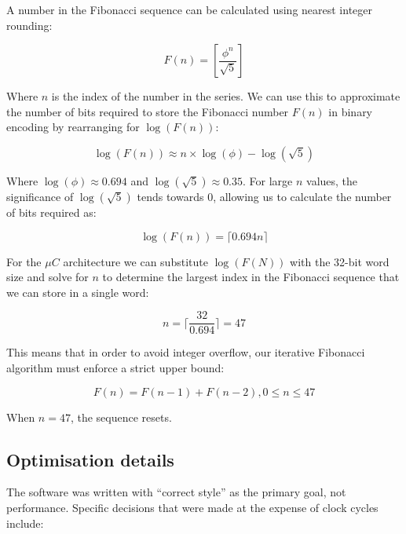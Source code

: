 \documentclass[12pt,a4paper]{article}
\begin{document}
A number in the Fibonacci sequence can be calculated using nearest
integer rounding:

$$F(n) = \left[\frac{\phi^n}{\sqrt{5}}\right] $$

Where $n$ is the index of the number in the series. We can use this to
approximate the number of bits required to store the Fibonacci number
$F(n)$ in binary encoding by rearranging for $\log(F(n))$:

$$\log(F(n)) \approx n \times \log(\phi) - \log(\sqrt{5})$$

Where $\log(\phi) \approx 0.694$ and $\log(\sqrt{5}) \approx
0.35$. For large $n$ values, the significance of $\log(\sqrt{5})$
tends towards $0$, allowing us to calculate the number of bits
required as:

$$\log(F(n)) = \lceil 0.694n \rceil$$

For the $\mu C$ architecture we can substitute $\log(F(N))$ with the
32-bit word size and solve for $n$ to determine the largest index in
the Fibonacci sequence that we can store in a single word:

$$n = \lceil \frac{32}{0.694} \rceil = 47$$

This means that in order to avoid integer overflow, our iterative
Fibonacci algorithm must enforce a strict upper bound:

$$F(n) = F(n - 1) + F(n - 2), 0 \le n \le 47$$

When $n = 47$, the sequence resets.

\subsection{Optimisation details}

The software was written with ``correct style'' as the primary goal,
not performance. Specific decisions that were made at the expense of
clock cycles include:
\end{document}
